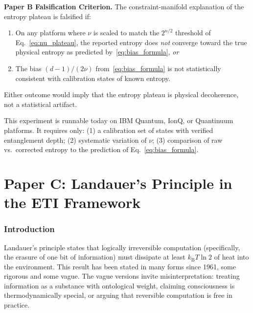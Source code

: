 \documentclass[12pt,letterpaper]{article}
\theoremstyle{plain}
\theoremstyle{definition}
\theoremstyle{remark}
\newcommand{\kB}{k_{\mathrm{B}}}
\begin{document}
\begin{corestatement}
\textbf{Paper B Falsification Criterion.} The constraint-manifold
explanation of the entropy plateau is falsified if:
\begin{enumerate}
  \item On any platform where $\nu$ is scaled to match the
    $2^{n/2}$ threshold of Eq.~\eqref{eq:nu_plateau}, the reported
    entropy does \emph{not} converge toward the true physical entropy
    as predicted by~\eqref{eq:bias_formula}, \emph{or}
  \item The bias $(d-1)/(2\nu)$ from~\eqref{eq:bias_formula} is not
    statistically consistent with calibration states of known entropy.
\end{enumerate}
Either outcome would imply that the entropy plateau is physical decoherence,
not a statistical artifact.
\end{corestatement}

This experiment is runnable today on IBM Quantum, IonQ, or Quantinuum
platforms. It requires only: (1) a calibration set of states with
verified entanglement depth; (2) systematic variation of $\nu$; (3)
comparison of raw vs.\ corrected entropy to the prediction of
Eq.~\eqref{eq:bias_formula}.

\newpage
\part*{Paper C: Landauer's Principle in the ETI Framework}

\section{Introduction}
\label{sec:intro_C}

Landauer's principle \cite{landauer1961} states that logically
irreversible computation (specifically, the erasure of one bit of
information) must dissipate at least $\kB T\ln 2$ of heat into the
environment. This result has been stated in many forms since 1961,
some rigorous \cite{bennett2003} and some vague. The vague versions
invite misinterpretation: treating information as a substance with
ontological weight, claiming consciousness is thermodynamically special,
or arguing that reversible computation is free in practice.
\end{document}
